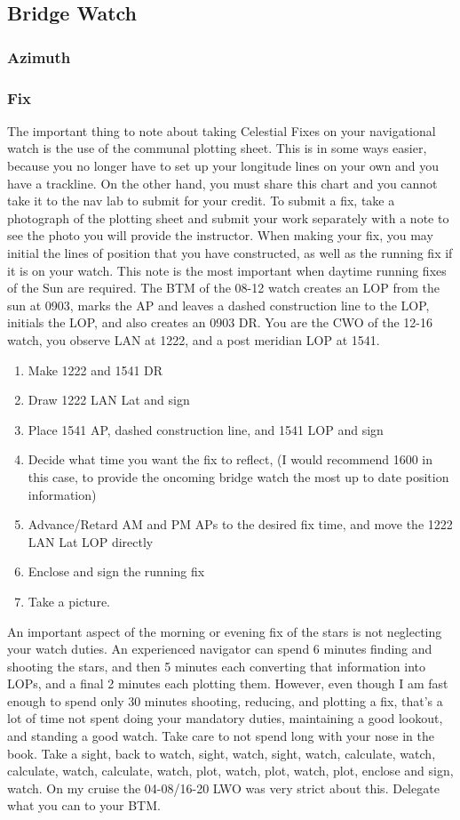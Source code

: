 \documentclass[letterpaper,12pt]{article}
\begin{document}
\subsection{Bridge Watch}
\subsubsection{Azimuth} \label{doubleget}
\subsubsection{Fix}
The important thing to note about taking Celestial Fixes on your navigational watch is the use of the communal plotting sheet.
This is in some ways easier, because you no longer have to set up your longitude lines on your own and you have a trackline.
On the other hand, you must share this chart and you cannot take it to the nav lab to submit for your credit.
To submit a fix, take a photograph of the plotting sheet and submit your work separately with a note to see the photo you will provide the instructor.
When making your fix, you may initial the lines of position that you have constructed, as well as the running fix if it is on your watch.
This note is the most important when daytime running fixes of the Sun are required.
The BTM of the 08-12 watch creates an LOP from the sun at 0903, marks the AP and leaves a dashed construction line to the LOP, initials the LOP, and also creates an 0903 DR.
You are the CWO of the 12-16 watch, you observe LAN at 1222, and a post meridian LOP \astrosun{} at 1541. 
\begin{enumerate}
	\item Make 1222 and 1541 DR
	\item Draw 1222 LAN Lat and sign
	\item Place 1541 AP, dashed construction line, and 1541 LOP and sign
	\item Decide what time you want the fix to reflect, (I would recommend 1600 in this case, to provide the oncoming bridge watch the most up to date position information)
	\item Advance/Retard AM and PM APs to the desired fix time, and move the 1222 LAN Lat LOP directly
	\item Enclose and sign the running fix
	\item Take a picture.
\end{enumerate}

An important aspect of the morning or evening fix of the stars is not neglecting your watch duties.
An experienced navigator can spend 6 minutes finding and shooting the stars, and then 5 minutes each converting that information into LOPs, and a final 2 minutes each plotting them. 
However, even though I am fast enough to spend only 30 minutes shooting, reducing, and plotting a fix, that's a lot of time not spent doing your mandatory duties, maintaining a good lookout, and standing a good watch.
Take care to not spend long with your nose in the book.
Take a sight, back to watch, sight, watch, sight, watch, calculate, watch, calculate, watch, calculate, watch, plot, watch, plot, watch, plot, enclose and sign, watch.
On my cruise the 04-08/16-20 LWO was very strict about this.
Delegate what you can to your BTM.
\clearpage
\printbibliography
\end{document}
